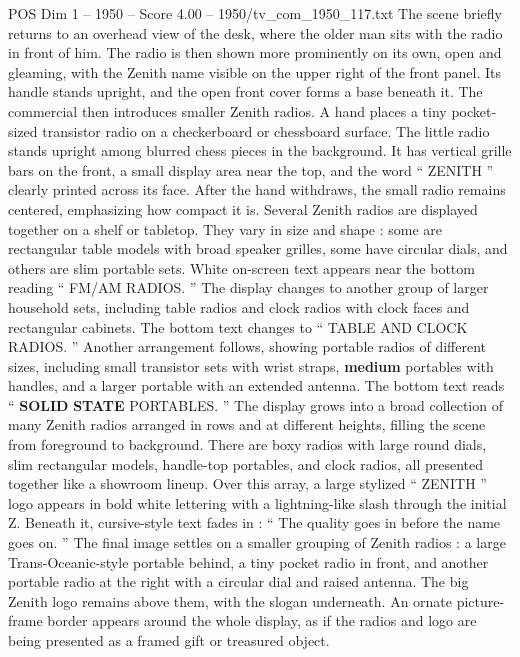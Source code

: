 \begin{textsample}{POS Dim 1 – 1950 – Score 4.00 – 1950/tv\_com\_1950\_117.txt}
The scene briefly returns to an overhead view of the desk, where the older man sits with the radio in front of him.
The radio is then shown more prominently on its own, open and gleaming, with the Zenith name visible on the upper right of the front panel.
Its handle stands upright, and the open front cover forms a base beneath it.
The commercial then introduces smaller Zenith radios.
A hand places a tiny pocket-sized transistor radio on a checkerboard or chessboard surface.
The little radio stands upright among blurred chess pieces in the background.
It has vertical grille bars on the front, a small display area near the top, and the word “ ZENITH ” clearly printed across its face.
After the hand withdraws, the small radio remains centered, emphasizing how compact it is.
Several Zenith radios are displayed together on a shelf or tabletop.
They vary in size and shape : some are rectangular table models with broad speaker grilles, some have circular dials, and others are slim portable sets.
White on-screen text appears near the bottom reading “ FM/AM RADIOS. ” The display changes to another group of larger household sets, including table radios and clock radios with clock faces and rectangular cabinets.
The bottom text changes to “ TABLE AND CLOCK RADIOS. ” Another arrangement follows, showing portable radios of different sizes, including small transistor sets with wrist straps, \textbf{medium} portables with handles, and a larger portable with an extended antenna.
The bottom text reads “ \textbf{SOLID} \textbf{STATE} PORTABLES. ” The display grows into a broad collection of many Zenith radios arranged in rows and at different heights, filling the scene from foreground to background.
There are boxy radios with large round dials, slim rectangular models, handle-top portables, and clock radios, all presented together like a showroom lineup.
Over this array, a large stylized “ ZENITH ” logo appears in bold white lettering with a lightning-like slash through the initial Z.
Beneath it, cursive-style text fades in : “ The quality goes in before the name goes on. ” The final image settles on a smaller grouping of Zenith radios : a large Trans-Oceanic-style portable behind, a tiny pocket radio in front, and another portable radio at the right with a circular dial and raised antenna.
The big Zenith logo remains above them, with the slogan underneath.
An ornate picture-frame border appears around the whole display, as if the radios and logo are being presented as a framed gift or treasured object.

\end{textsample}
